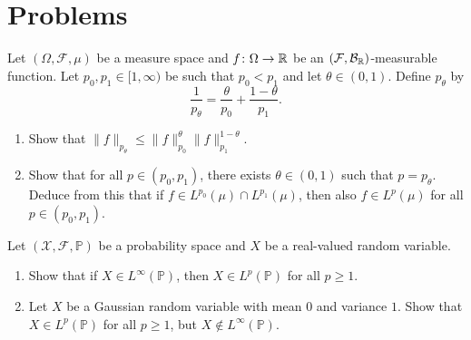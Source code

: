 %
%	

\section{Problems}

\begin{problem}
		Let $(\Omega,\mathcal{F},\mu)$ be a measure space and $f\colon\Omega\to\mathbb R$ be an $(\mathcal{F},\mathcal{B}_{\mathbb R})$-measurable function. Let $p_0,p_1\in[1,
		\infty)$ be such that $p_0<p_1$ and let $\theta\in(0,1)$. Define $p_\theta$ by
		\[
			\frac{1}{p_\theta} = \frac{\theta}{p_0} + \frac{1-\theta}{p_1}.
		\]
		\begin{enumerate}[label={(\alph*)}]
			\item Show that $\|f\|_{p_\theta}\le \|f\|_{p_0}^\theta\|f\|_{p_1}^{1-\theta}$.
			\item Show that for all $p\in(p_0,p_1)$, there exists $\theta\in(0,1)$ such that $p=p_\theta$. Deduce from this that if $f\in L^{p_0}(\mu)\cap L^{p_1}(\mu)$, then also $f\in L^p(\mu)$ for all $p\in(p_0,p_1)$.
		\end{enumerate}
\end{problem}

\begin{problem}
Let $(\mathcal{X},\mathcal{F},\mathbb{P})$ be a probability space and $X$ be a real-valued random variable.
	\begin{enumerate}[label={(\alph*)}]
		\item Show that if $X\in L^\infty(\mathbb{P})$, then $X\in L^p(\mathbb{P})$ for all $p\ge 1$.
		\item Let $X$ be a Gaussian random variable with mean $0$ and variance $1$. Show that $X\in L^p(\mathbb{P})$ for all $p\ge 1$, but $X\notin L^\infty(\mathbb{P})$.
	\end{enumerate}
\end{problem}

